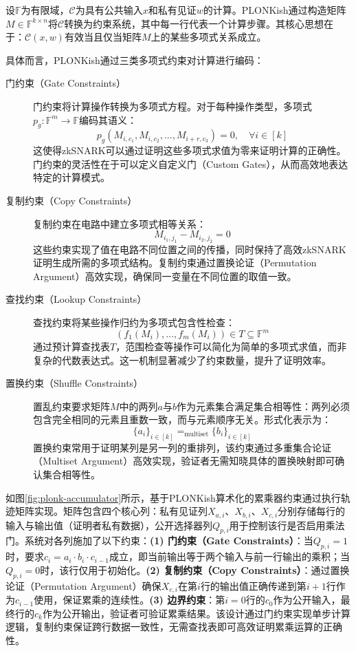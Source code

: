 设$\mathbb{F}$为有限域，$\mathcal{C}$为具有公共输入$x$和私有见证$w$的计算。PLONKish通过构造矩阵$M \in \mathbb{F}^{k \times n}$将$\mathcal{C}$转换为约束系统，其中每一行代表一个计算步骤。其核心思想在于：$\mathcal{C}(x,w)$有效当且仅当矩阵$M$上的某些多项式关系成立。

具体而言，PLONKish通过三类多项式约束对计算进行编码：

\begin{description}
    \item[门约束（Gate Constraints）] 门约束将计算操作转换为多项式方程。对于每种操作类型，多项式$p_{g}: \mathbb{F}^{m} \rightarrow \mathbb{F}$编码其语义：
    $$p_{g}(M_{i,c_{1}}, M_{i,c_{2}}, ..., M_{i+r,c_{3}}) = 0, \quad \forall i \in [k]$$
    这使得zkSNARK可以通过证明这些多项式求值为零来证明计算的正确性。门约束的灵活性在于可以定义自定义门（Custom Gates），从而高效地表达特定的计算模式。\cite{10.1007/978-3-031-68403-6_11}
    
    \item[复制约束（Copy Constraints）] 复制约束在电路中建立多项式相等关系：
    $$M_{i_{1},j_{1}} - M_{i_{2},j_{2}} = 0$$
    这些约束实现了值在电路不同位置之间的传播，同时保持了高效zkSNARK证明生成所需的多项式结构。复制约束通过置换论证（Permutation Argument）高效实现，确保同一变量在不同位置的取值一致。
    
    \item[查找约束（Lookup Constraints）] 查找约束将某些操作归约为多项式包含性检查：
    $$(f_{1}(M_{i}), ..., f_{m}(M_{i})) \in T \subseteq \mathbb{F}^{m}$$
    通过预计算查找表$T$，范围检查等操作可以简化为简单的多项式求值，而非复杂的代数表达式。这一机制显著减少了约束数量，提升了证明效率。\cite{cryptoeprint:2023/1518}

    \item[置换约束（Shuffle Constraints）] 置乱约束要求矩阵$M$中的两列$a$与$b$作为元素集合满足集合相等性：两列必须包含完全相同的元素且重数一致，而与元素顺序无关。形式化表示为：
    $$\{a_{i}\}_{i \in [k]} =_{\text{multiset}} \{b_{i}\}_{i \in [k]}$$
    置换约束常用于证明某列是另一列的重排列，该约束通过多重集合论证（Multiset Argument）高效实现，验证者无需知晓具体的置换映射即可确认集合相等性。
\end{description}

如图\ref{fig:plonk-accumulator}所示，基于PLONKish算术化的累乘器约束通过执行轨迹矩阵实现。矩阵包含四个核心列：私有见证列$X_{a,i}$、$X_{b,i}$、$X_{c,i}$分别存储每行的输入与输出值（证明者私有数据），公开选择器列$Q_{p,i}$用于控制该行是否启用乘法门。系统对各列施加了以下约束：\textbf{(1) 门约束（Gate Constraints）}：当$Q_{p,i} = 1$时，要求$c_i = a_i \cdot b_i \cdot c_{i-1}$成立，即当前输出等于两个输入与前一行输出的乘积；当$Q_{p,i} = 0$时，该行仅用于初始化。\textbf{(2) 复制约束（Copy Constraints）}：通过置换论证（Permutation Argument）确保$X_{c,i}$在第$i$行的输出值正确传递到第$i+1$行作为$c_{i-1}$使用，保证累乘的连续性。\textbf{(3) 边界约束}：第$i=0$行的$c_0$作为公开输入，最终行的$c_k$作为公开输出，验证者可验证累乘结果。该设计通过门约束实现单步计算逻辑，复制约束保证跨行数据一致性，无需查找表即可高效证明累乘运算的正确性。

